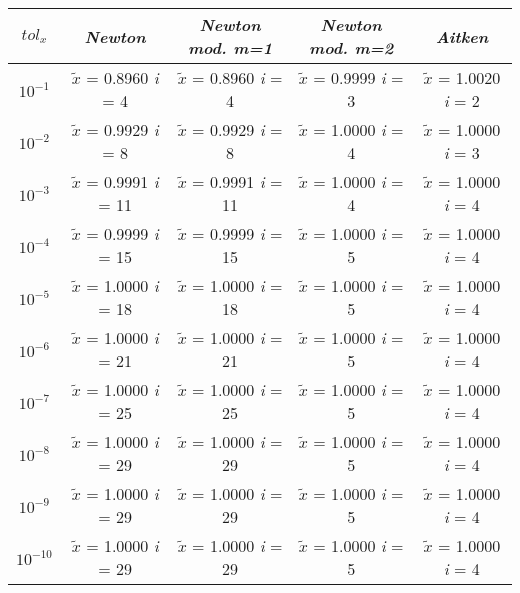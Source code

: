 \begin{center}
	\begin{tabular}{|c|c|c|c|c|}
		\hline
			$tol_x$ & \textit{Newton} & \textit{Newton mod. m=1} & \textit{Newton mod. m=2} & \textit{Aitken} \\
		\hline
			$10^{-1}$ & $\tilde{x}$ = 0.8960 \quad \textit{i} = 4 & $\tilde{x}$ = 0.8960 \quad \textit{i} = 4 & $\tilde{x}$ = 0.9999 \quad \textit{i} = 3 & $\tilde{x}$ = 1.0020 \quad \textit{i} = 2\\
			$10^{-2}$ & $\tilde{x}$ = 0.9929 \quad \textit{i} = 8 & $\tilde{x}$ = 0.9929 \quad \textit{i} = 8 & $\tilde{x}$ = 1.0000 \quad \textit{i} = 4 & $\tilde{x}$ = 1.0000 \quad \textit{i} = 3\\
			$10^{-3}$ & $\tilde{x}$ = 0.9991 \quad \textit{i} = 11 & $\tilde{x}$ = 0.9991 \quad \textit{i} = 11 & $\tilde{x}$ = 1.0000 \quad \textit{i} = 4 & $\tilde{x}$ = 1.0000 \quad \textit{i} = 4\\
			$10^{-4}$ & $\tilde{x}$ = 0.9999 \quad \textit{i} = 15 & $\tilde{x}$ = 0.9999 \quad \textit{i} = 15 & $\tilde{x}$ = 1.0000 \quad \textit{i} = 5 & $\tilde{x}$ = 1.0000 \quad \textit{i} = 4\\
			$10^{-5}$ & $\tilde{x}$ = 1.0000 \quad \textit{i} = 18 & $\tilde{x}$ = 1.0000 \quad \textit{i} = 18 & $\tilde{x}$ = 1.0000 \quad \textit{i} = 5 & $\tilde{x}$ = 1.0000 \quad \textit{i} = 4\\
			$10^{-6}$ & $\tilde{x}$ = 1.0000 \quad \textit{i} = 21 & $\tilde{x}$ = 1.0000 \quad \textit{i} = 21 & $\tilde{x}$ = 1.0000 \quad \textit{i} = 5 & $\tilde{x}$ = 1.0000 \quad \textit{i} = 4\\
			$10^{-7}$ & $\tilde{x}$ = 1.0000 \quad \textit{i} = 25 & $\tilde{x}$ = 1.0000 \quad \textit{i} = 25 & $\tilde{x}$ = 1.0000 \quad \textit{i} = 5 & $\tilde{x}$ = 1.0000 \quad \textit{i} = 4\\
			$10^{-8}$ & $\tilde{x}$ = 1.0000 \quad \textit{i} = 29 & $\tilde{x}$ = 1.0000 \quad \textit{i} = 29 & $\tilde{x}$ = 1.0000 \quad \textit{i} = 5 & $\tilde{x}$ = 1.0000 \quad \textit{i} = 4\\
			$10^{-9}$ & $\tilde{x}$ = 1.0000 \quad \textit{i} = 29 & $\tilde{x}$ = 1.0000 \quad \textit{i} = 29 & $\tilde{x}$ = 1.0000 \quad \textit{i} = 5 & $\tilde{x}$ = 1.0000 \quad \textit{i} = 4\\
			$10^{-10}$ & $\tilde{x}$ = 1.0000 \quad \textit{i} = 29 & $\tilde{x}$ = 1.0000 \quad \textit{i} = 29 & $\tilde{x}$ = 1.0000 \quad \textit{i} = 5 & $\tilde{x}$ = 1.0000 \quad \textit{i} = 4\\

\end{tabular}
\end{center}
